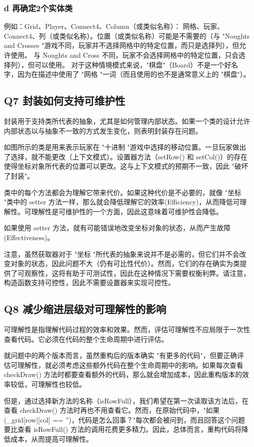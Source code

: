 \subsubsection{d 再确定2个实体类}

例如：Grid、Player、Connect4、Column（或类似名称）： 网格、玩家、Connect4、列（或类似名称）。位置（或类似名称）可能是不需要的（与 "Noughts and Crosses "游戏不同，玩家并不选择网格中的特定位置，而只是选择列），但允许使用。
与 Noughts and Cross 不同，玩家不会选择网格中的特定位置，只会选择列），但可以使用。
对于这种情境模式来说，"棋盘"（Board）不是一个好名字，因为在描述中使用了 "网格 "一词（而且使用的也不是通常意义上的 "棋盘"）。


\subsection{Q7 封装如何支持可维护性}
封装用于支持类所代表的抽象，尤其是如何管理内部状态。如果一个类的设计允许内部状态以与抽象不一致的方式发生变化，则表明封装存在问题。

如图所示的类是用来表示玩家在 "十进制 "游戏中选择的移动位置。一旦玩家做出了选择，就不能更改（上下文模式）。设置器方法（setRow() 和 setCol()）的存在使得坐标对象所代表的位置可以更改。这与上下文模式的预期不一致，因此 "破坏了封装"。

类中的每个方法都会为理解它带来代价。如果这种代价是不必要的，就像 "坐标 "类中的 setter 方法一样，那么就会降低理解它的效率(Efficiency)，从而降低可理解性。可理解性是可维护性的一个方面，因此这意味着可维护性会降低。

如果使用 setter 方法，就有可能错误地改变坐标对象的状态，从而产生故障(Effectiveness)。

注意，虽然获取器对于 "坐标 "所代表的抽象来说并不是必需的，但它们并不会改变对象的状态，因此问题不大（仍有可比性代价）。然而，它们的存在确实为类提供了可观察性，这将有助于可测试性，因此在这种情况下需要权衡利弊。请注意，构造函数支持可控性，因此不需要设置器来实现可控性。

\subsection{Q8 减少缩进层级对可理解性的影响}

可理解性是指理解代码过程的效率和效果。然而，评估可理解性不应局限于一次性查看代码。它必须在代码的整个生命周期中进行评估。

就问题中的两个版本而言，虽然重构后的版本确实 "有更多的代码"，但要正确评估可理解性，就必须考虑这些额外代码在整个生命周期中的影响。如果每次查看 checkDraw() 方法时都要查看额外的代码，那么就会增加成本，因此重构版本的效率较低，可理解性也较低。

但是，通过选择新方法的名称（isRowFull），我们希望在第一次读取该方法后，在查看 checkDraw() 方法时再也不用查看它。然而，在原始代码中，"如果 (\_grid[row][col] == '')，代码是怎么回事？"每次都会被问到，而且回答这个问题要比查看 isRowFull() 方法的调用花费更多精力。因此，总体而言，重构代码将降低成本，从而提高可理解性。

